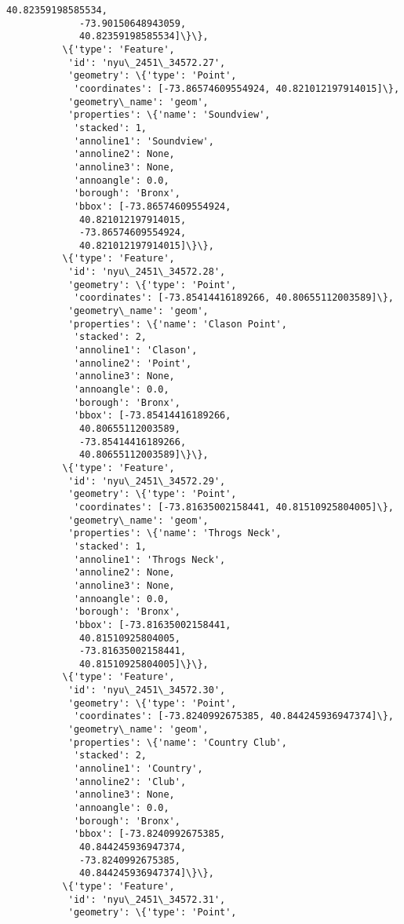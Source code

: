 \documentclass[11pt]{article}
\begin{document}
\begin{Verbatim}[commandchars=\\\{\}]
             40.82359198585534,
             -73.90150648943059,
             40.82359198585534]\}\},
          \{'type': 'Feature',
           'id': 'nyu\_2451\_34572.27',
           'geometry': \{'type': 'Point',
            'coordinates': [-73.86574609554924, 40.821012197914015]\},
           'geometry\_name': 'geom',
           'properties': \{'name': 'Soundview',
            'stacked': 1,
            'annoline1': 'Soundview',
            'annoline2': None,
            'annoline3': None,
            'annoangle': 0.0,
            'borough': 'Bronx',
            'bbox': [-73.86574609554924,
             40.821012197914015,
             -73.86574609554924,
             40.821012197914015]\}\},
          \{'type': 'Feature',
           'id': 'nyu\_2451\_34572.28',
           'geometry': \{'type': 'Point',
            'coordinates': [-73.85414416189266, 40.80655112003589]\},
           'geometry\_name': 'geom',
           'properties': \{'name': 'Clason Point',
            'stacked': 2,
            'annoline1': 'Clason',
            'annoline2': 'Point',
            'annoline3': None,
            'annoangle': 0.0,
            'borough': 'Bronx',
            'bbox': [-73.85414416189266,
             40.80655112003589,
             -73.85414416189266,
             40.80655112003589]\}\},
          \{'type': 'Feature',
           'id': 'nyu\_2451\_34572.29',
           'geometry': \{'type': 'Point',
            'coordinates': [-73.81635002158441, 40.81510925804005]\},
           'geometry\_name': 'geom',
           'properties': \{'name': 'Throgs Neck',
            'stacked': 1,
            'annoline1': 'Throgs Neck',
            'annoline2': None,
            'annoline3': None,
            'annoangle': 0.0,
            'borough': 'Bronx',
            'bbox': [-73.81635002158441,
             40.81510925804005,
             -73.81635002158441,
             40.81510925804005]\}\},
          \{'type': 'Feature',
           'id': 'nyu\_2451\_34572.30',
           'geometry': \{'type': 'Point',
            'coordinates': [-73.8240992675385, 40.844245936947374]\},
           'geometry\_name': 'geom',
           'properties': \{'name': 'Country Club',
            'stacked': 2,
            'annoline1': 'Country',
            'annoline2': 'Club',
            'annoline3': None,
            'annoangle': 0.0,
            'borough': 'Bronx',
            'bbox': [-73.8240992675385,
             40.844245936947374,
             -73.8240992675385,
             40.844245936947374]\}\},
          \{'type': 'Feature',
           'id': 'nyu\_2451\_34572.31',
           'geometry': \{'type': 'Point',

\end{Verbatim}
\end{document}
